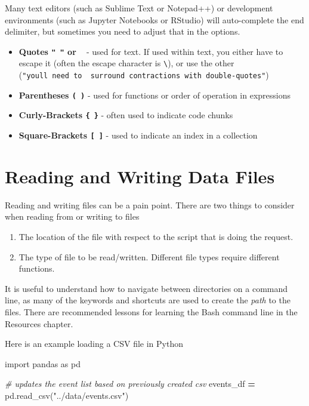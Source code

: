 \documentclass[
]{book}
\newenvironment{Shaded}{\begin{snugshade}}{\end{snugshade}}
\newcommand{\CommentTok}[1]{\textcolor[rgb]{0.56,0.35,0.01}{\textit{#1}}}
\newcommand{\ImportTok}[1]{#1}
\newcommand{\NormalTok}[1]{#1}
\newcommand{\OperatorTok}[1]{\textcolor[rgb]{0.81,0.36,0.00}{\textbf{#1}}}
\newcommand{\StringTok}[1]{\textcolor[rgb]{0.31,0.60,0.02}{#1}}
\providecommand{\tightlist}{%
  \setlength{\itemsep}{0pt}\setlength{\parskip}{0pt}}
\begin{document}
Many text editors (such as Sublime Text or Notepad++) or development environments
(such as Jupyter Notebooks or RStudio)
will auto-complete the end delimiter, but sometimes
you need to adjust that in the options.

\begin{itemize}
\tightlist
\item
  \textbf{Quotes \texttt{"\ "} or \texttt{\textquotesingle{}\ \textquotesingle{}}} - used for text. If used within text, you either have to
  escape it (often the escape character is \texttt{\textbackslash{}}), or use the other (\texttt{"you\textquotesingle{}ll\ need\ to\ \ surround\ contractions\ with\ double-quotes"})
\item
  \textbf{Parentheses \texttt{(\ )}} - used for functions or order of operation in expressions
\item
  \textbf{Curly-Brackets \texttt{\{\ \}}} - often used to indicate code chunks
\item
  \textbf{Square-Brackets \texttt{{[}\ {]}}} - used to indicate an index in a collection
\end{itemize}

\section{Reading and Writing Data Files}\label{reading-and-writing-data-files}

Reading and writing files can be a pain point. There are two things to consider
when reading from or writing to files

\begin{enumerate}
\def\labelenumi{\arabic{enumi}.}
\tightlist
\item
  The location of the file with respect to the script that is doing the request.
\item
  The type of file to be read/written. Different file types require different functions.
\end{enumerate}

It is useful to understand how to navigate between directories on a command line, as
many of the keywords and shortcuts are used to create the \emph{path} to the files.
There are recommended lessons for learning the Bash command line in the Resources chapter.

Here is an example loading a CSV file in Python

\begin{Shaded}
\begin{Highlighting}[]
\ImportTok{import}\NormalTok{ pandas }\ImportTok{as}\NormalTok{ pd}

\CommentTok{\# updates the event list based on previously created csv}
\NormalTok{events\_df }\OperatorTok{=}\NormalTok{ pd.read\_csv(}\StringTok{"../data/events.csv"}\NormalTok{)}
\end{Highlighting}
\end{Shaded}
\end{document}
